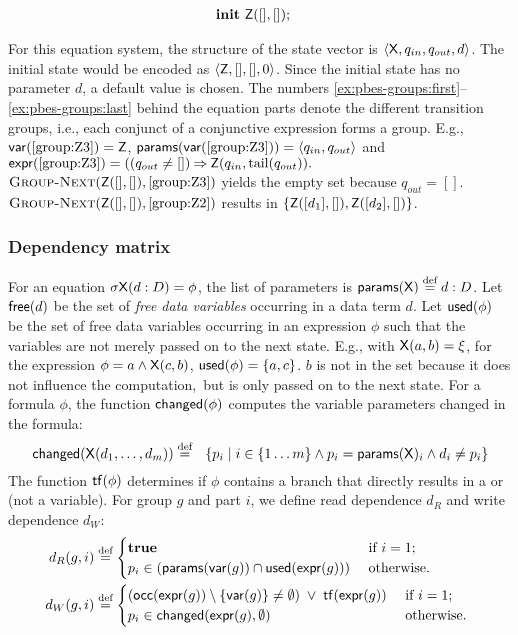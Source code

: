 \documentclass{article}
\begin{document}
\begin{example}
\begin{center}
{\begin{minipage}{6in}
\begin{align}
\notag
\init & \propvar{Z}([], []);
\end{align}
\end{minipage}
}
\end{center}
For this equation system, the structure of the state vector is $\left\langle \mathsf{X}, q_{in}, q_{out}, d \right\rangle$.
The initial state would be encoded as $\left\langle \mathsf{Z}, [], [], 0 \right\rangle$. Since the initial
state has no parameter $d$, a default value is chosen.
The numbers \ref{ex:pbes-groups:first}--\ref{ex:pbes-groups:last} behind the equation parts denote the different transition groups, i.e.,
each conjunct of a conjunctive expression forms a group.
E.g., $\operatorname*{\mathsf{var}}(\ref{group:Z3}) = \mathsf{Z}$, $\operatorname*{\mathsf{params}}(\operatorname*{\mathsf{var}}(\ref{group:Z3})) = \left\langle q_{in}, q_{out} \right\rangle$
and 
$ \operatorname*{\mathsf{expr}}(\ref{group:Z3}) =((q_{out} \neq []) \mathbin{\Rightarrow} \mathsf{Z}(q_{in}, \operatorname*{tail}(q_{out})). $
$\textsc{Group-Next}(\mathsf{Z}([], []), \ref{group:Z3})$ yields the empty set because $q_{out} = []$.
$\textsc{Group-Next}(\mathsf{Z}([], []), \ref{group:Z2})$ results in $\left\lbrace \mathsf{Z}([d_1], []), \mathsf{Z}([d_2], []) \right\rbrace$.
\end{example}


\subsubsection{Dependency matrix}

For an equation $\sigma \mathsf{X}(d : D) = \phi$, the list of parameters is $\operatorname*{\mathsf{params}}(\mathsf{X}) \mathrel{\displaystyle \mathop{=}^{\text{def}}} d : D$.
Let $\operatorname*{\mathsf{free}}(d)$ be the set of \emph{free data variables} occurring in a data term $d$. 
Let $\operatorname*{\mathsf{used}}(\phi)$ be the 
set of free data variables occurring in an expression $\phi$ such that
the variables are not merely passed on to the next state.
E.g., with $\mathsf{X}(a, b) = \xi$, for the expression $\phi = a \land \mathsf{X}(c, b)$,
$\operatorname*{\mathsf{used}}(\phi) = \left\lbrace a, c \right\rbrace$. $b$ is not in the set because it does not influence the computation,\
but is only passed on to the next state.
For a formula $\phi$, the function $\operatorname*{\mathsf{changed}}(\phi)$
computes the variable parameters changed in the formula:
\[ \operatorname*{\mathsf{changed}}(\mathsf{X}(d_1, \ldots, d_m))  \mathrel{\displaystyle \mathop{=}^{\text{def}}}\ \  \left\lbrace p_i \mid i \in \left\lbrace 1 \ldots m \right\rbrace \land p_i = \operatorname*{\mathsf{params}}(\mathsf{X})_i \land d_i \neq p_i  \right\rbrace \]
The function $\operatorname*{\mathsf{tf}}(\phi)$
determines if $\phi$ contains a branch that directly results in a \ttrue or \tfalse (not a variable).
For group $g$ and part $i$, we define read dependence $d_{R}$ and write dependence $d_{W}$:
\begin{align*}
d_{R}(g, i) &\mathrel{\displaystyle \mathop{=}^{\text{def}}} \begin{cases}
\mathbf{true} & \text{ if } i=1;\\
p_i \in ( \operatorname*{\mathsf{params}}(\operatorname*{\mathsf{var}}(g)) \cap \operatorname*{\mathsf{used}}(\operatorname*{\mathsf{expr}}(g)) ) & \text{ otherwise. }
\end{cases}\\
d_{W}(g, i) &\mathrel{\displaystyle \mathop{=}^{\text{def}}} \begin{cases}
\left( \operatorname*{\mathsf{occ}}(\operatorname*{\mathsf{expr}}(g)) \setminus \left\lbrace \operatorname*{\mathsf{var}}(g) \right\rbrace \neq \emptyset \right) 
\; \lor \; \operatorname*{\mathsf{tf}}(\operatorname*{\mathsf{expr}}(g)) 
& \text{ if } i=1;\\
p_i \in \operatorname*{\mathsf{changed}}(\operatorname*{\mathsf{expr}}(g), \emptyset)
& \text{ otherwise. }
\end{cases}
\end{align*}
\end{document}
